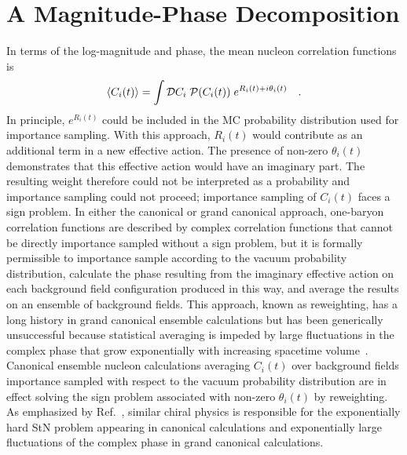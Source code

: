 \section{A Magnitude-Phase Decomposition}
\label{sec:decomposition}

In terms of the log-magnitude and  phase, the mean nucleon correlation functions is
%
\begin{equation}
  \begin{split}
    \left< C_i(t) \right> =  \int\mathcal{D}C_i\;\mathcal{P}(C_i(t))\; e^{R_i(t) + i\theta_i(t)}
    \ \ \ .
  \end{split}
  \label{Csignproblem}
\end{equation}
%
In principle, $e^{R_i(t)}$ could be included in the MC probability distribution used for importance sampling. 
With this approach, $R_i(t)$ would contribute as an additional term in a new effective action. 
The presence of non-zero $\theta_i(t)$ demonstrates that this effective action would have an imaginary part. 
The resulting  weight therefore could not be interpreted as a probability and importance sampling 
could not proceed; importance sampling of $C_i(t)$ faces a sign problem. 
In either the canonical or grand canonical approach, one-baryon correlation functions are described by 
complex correlation functions that cannot be directly importance sampled without a sign problem,
but 
 it is formally permissible to importance sample according to the vacuum probability distribution, calculate the  phase resulting from the imaginary effective action on each background field configuration produced in this way, 
 and average the results on an ensemble of background fields. 
 This approach, known as reweighting, has a long history in grand canonical ensemble calculations 
 but has been generically unsuccessful because statistical averaging is impeded by large fluctuations in the complex phase that grow exponentially with increasing spacetime volume~\cite{Gibbs:1986ut,Splittorff:2006fu,Splittorff:2007ck}. 
 Canonical ensemble nucleon calculations averaging $C_i(t)$ over background fields importance sampled 
 with respect to the vacuum probability distribution are in effect solving the sign problem associated with 
 non-zero $\theta_i(t)$ by reweighting. As emphasized by Ref.~\cite{Grabowska:2012ik}, 
 similar chiral physics is responsible for the exponentially hard StN problem appearing in canonical 
 calculations and exponentially large fluctuations of the complex phase in grand canonical calculations.



